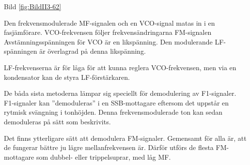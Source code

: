 Bild \ref{fig:BildII3-62}

Den frekvensmodulerade MF-signalen och en VCO-signal matas in i en
fasjämförare. VCO-frekvensen följer frekvensändringarna FM-signalen
Avstämningsspänningen för VCO är en likspänning. Den modulerande
LF-spänningen är överlagrad på denna likspänning.

LF-frekvenserna är för låga för att kunna reglera VCO-frekvensen, men
via en kondensator kan de styra LF-förstärkaren.

De båda sista metoderna lämpar sig speciellt för demodulering av
F1-signaler. F1-signaler kan ''demoduleras'' i en SSB-mottagare eftersom
det uppstår en rytmisk svängning i tonhöjden. Denna frekvensmodulerade
ton kan sedan demoduleras på sätt som beskrivits.

Det finns ytterligare sätt att demodulera FM-signaler. Gemensamt för
alla är, att de fungerar bättre ju lägre mellanfrekvensen är.  Därför
utförs de flesta FM-mottagare som dubbel- eller trippelsuprar, med låg
MF.
